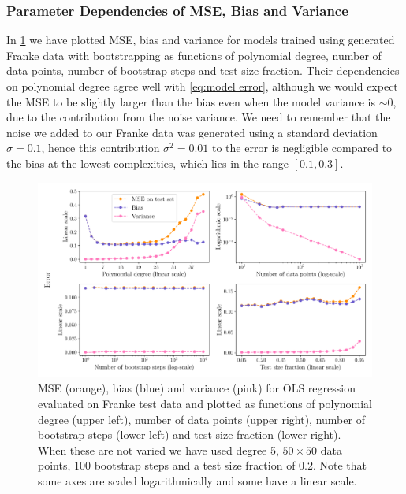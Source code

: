 \documentclass[aps,pra,english,notitlepage,reprint,nofootinbib]{revtex4-1}  %
\begin{document}
\subsubsection{Parameter Dependencies of MSE, Bias and Variance}
In \cref{fig:e bias variance} we have plotted MSE, bias and variance for models trained using generated Franke data with bootstrapping as functions of polynomial degree, number of data points, number of bootstrap steps and test size fraction. Their dependencies on polynomial degree agree well with \eqref{eq:model error}, although we would expect the MSE to be slightly larger than the bias even when the model variance is $\sim0$, due to the contribution from the noise variance. We need to remember that the noise we added to our Franke data was generated using a standard deviation $\sigma=0.1$, hence this contribution $\sigma^2=0.01$ to the error is negligible compared to the bias at the lowest complexities, which lies in the range $[0.1,0.3]$. 

\begin{figure}
  \vspace*{-5pt}
  \centering %
  \includegraphics[width=\textwidth]{../figs/e_bias_variance.pdf}
  \caption{MSE (orange), bias (blue) and variance (pink) for OLS regression evaluated on Franke test data and plotted as functions of polynomial degree (upper left), number of data points (upper right), number of bootstrap steps (lower left) and test size fraction (lower right). When these are not varied we have used degree 5, $50\times50$ data points, 100 bootstrap steps and a test size fraction of 0.2. Note that some axes are scaled logarithmically and some have a linear scale.}\label{fig:e bias variance}
  \vspace*{-5pt}
\end{figure}
\end{document}
